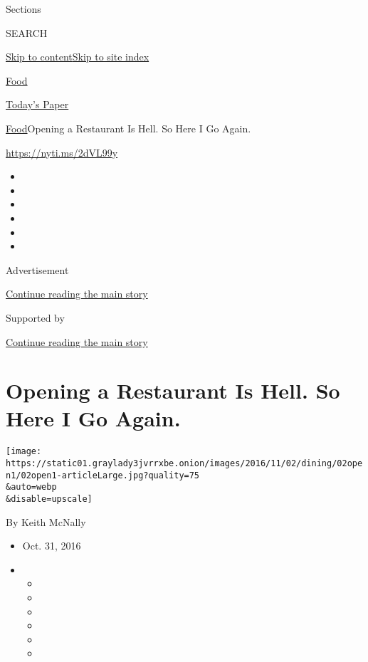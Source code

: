 Sections

SEARCH

\protect\hyperlink{site-content}{Skip to
content}\protect\hyperlink{site-index}{Skip to site index}

\href{https://www.nytimes3xbfgragh.onion/section/food}{Food}

\href{https://myaccount.nytimes3xbfgragh.onion/auth/login?response_type=cookie\&client_id=vi}{}

\href{https://www.nytimes3xbfgragh.onion/section/todayspaper}{Today's
Paper}

\href{/section/food}{Food}\textbar{}Opening a Restaurant Is Hell. So
Here I Go Again.

\url{https://nyti.ms/2dVL99y}

\begin{itemize}
\item
\item
\item
\item
\item
\item
\end{itemize}

Advertisement

\protect\hyperlink{after-top}{Continue reading the main story}

Supported by

\protect\hyperlink{after-sponsor}{Continue reading the main story}

\hypertarget{opening-a-restaurant-is-hell-so-here-i-go-again}{%
\section{Opening a Restaurant Is Hell. So Here I Go
Again.}\label{opening-a-restaurant-is-hell-so-here-i-go-again}}

\texttt{[image: https://static01.graylady3jvrrxbe.onion/images/2016/11/02/dining/02open1/02open1-articleLarge.jpg?quality=75\\\&auto=webp\\\&disable=upscale]}

By Keith McNally

\begin{itemize}
\item
  Oct. 31, 2016
\item
  \begin{itemize}
  \item
  \item
  \item
  \item
  \item
  \item
  \end{itemize}
\end{itemize}

